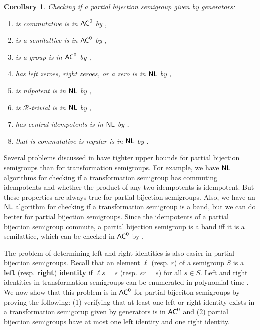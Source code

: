 \documentclass{amsart}
\newcommand{\NL}{\ensuremath\mathsf{NL}}
\newcommand{\AC}{\ensuremath\mathsf{AC}}
\newcommand{\gR}{\mathcal{R}}
\newtheorem{corollary}[theorem]{Corollary}
\theoremstyle{remark}
\numberwithin{equation}{section}
\begin{document}
\begin{corollary} \label{cor:red}
Checking if a partial bijection semigroup given by generators:
\begin{enumerate}
\item is commutative is in $\AC^0$ by \cite[Thm 3.2]{FJ:CP},
\item is a semilattice is in $\AC^0$ by  \cite[Thm 3.3]{FJ:CP},
\item is a group is in $\AC^0$ by  \cite[Thm 3.5]{FJ:CP},
\item has left zeroes, right zeroes, or a zero is in $\NL$ by \cite[Thm 4.6]{FJ:CP},
\item is nilpotent is in $\NL$ by \cite[Thm 4.10]{FJ:CP},
\item is $\gR$-trivial is in $\NL$ by \cite[Thm 4.13]{FJ:CP},
\item has central idempotents is in $\NL$ by \cite[Cor 5.2]{FJ:CP},
\item that is commutative is regular is in $\NL$ by \cite[Cor 5.7]{FJ:CP}.
\end{enumerate}
\end{corollary}

Several problems discussed in \cite{FJ:CP} have tighter upper bounds for partial bijection semigroups than for transformation semigroups. For example, we have $\NL$ algorithms for checking if a transformation semigroup has commuting idempotents and whether the product of any two idempotents is idempotent. But these properties are always true for partial bijection semigroups. Also, we have an $\NL$ algorithm for checking if a transformation semigroup is a band, but we can do better for partial bijection semigroups. Since the idempotents of a partial bijection semigroup commute, a partial bijection semigroup is a band iff it is a semilattice, which can be checked in $\AC^0$ by \cite[Thm 3]{FJ:CP}.

The problem of determining left and right identities is also easier in partial bijection semigroups. Recall that an element $\ell$ (resp. $r$) of a semigroup $S$ is a {\bf left} (resp. {\bf right}) {\bf identity} if $\ell s = s$ (resp. $sr = s$) for all $s \in S$. Left and right identities in transformation semigroups can be enumerated in polynomial time \cite[Thm 6.2 and 6.4]{FJ:CP}. We now show that this problem is in $\AC^0$ for partial bijeciton semigroups by proving the following: (1) verifying that at least one left or right identity exists in a transformation semigorup given by generators is in $\AC^0$ and (2) partial bijection semigroups have at most one left identity and one right identity.
\end{document}
